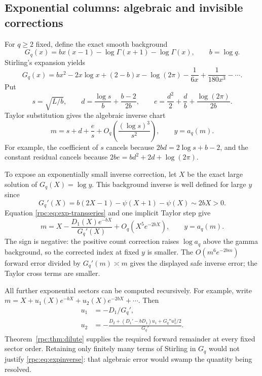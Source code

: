 \documentclass[11pt]{article}
\theoremstyle{definition}
\theoremstyle{remark}
\numberwithin{equation}{section}
\begin{document}
\subsection{Exponential columns: algebraic and invisible corrections}

For $q\ge2$ fixed, define the exact smooth background
\begin{equation}\label{rpc:eq:F0}
 G_q(x)=b x(x-1)-\log\Gamma(x+1)-\log\Gamma(x),\qquad b=\log q.
\end{equation}
Stirling's expansion yields
\[
 G_q(x)=b x^2-2x\log x+(2-b)x-\log(2\pi)
                -\frac1{6x}+\frac1{180x^3}-\cdots.
\]
Put
\begin{equation}\label{rpc:eq:sde}
 s=\sqrt{L/b},\qquad
 d=\frac{\log s}{b}+\frac{b-2}{2b},\qquad
 e=\frac{d^2}{2}+\frac db+\frac{\log(2\pi)}{2b}.
\end{equation}
Taylor substitution gives the algebraic inverse chart
\begin{equation}\label{rpc:eq:expalginverse}
 m=s+d+\frac es+O_q\!\left(\frac{(\log s)^3}{s^2}\right),
                         \qquad y=a_q(m).
\end{equation}
For example, the coefficient of $s$ cancels because
$2bd=2\log s+b-2$, and the constant residual cancels because
$2be=bd^2+2d+\log(2\pi)$.

To expose an exponentially small inverse correction, let $X$ be the exact
large solution of $G_q(X)=\log y$. This background inverse is well defined
for large $y$ since
\[
 G_q'(X)=b(2X-1)-\psi(X+1)-\psi(X)\sim2bX>0.
\]
Equation \eqref{rpc:eq:exp-transseries} and one implicit Taylor step give
\begin{equation}\label{rpc:eq:expinverse}
 m=X-\frac{D_1(X)e^{-bX}}{G_q'(X)}
             +O_q(X^5e^{-2bX}),\qquad y=a_q(m).
\end{equation}
The sign is negative: the positive count correction raises $\log a_q$ above
the gamma background, so the corrected index at fixed $y$ is smaller.
The $O(m^6e^{-2bm})$ forward error divided by $G_q'(m)\asymp m$ gives
the displayed safe inverse error; the Taylor cross terms are smaller.

All further exponential sectors can be computed recursively. For example,
write $m=X+u_1(X)e^{-bX}+u_2(X)e^{-2bX}+\cdots$. Then
\begin{align}\label{rpc:eq:inverse-sector-rec}
 u_1&=-D_1/G_q',\\
 u_2&=-\frac{D_2+(D_1'-bD_1)u_1+G_q''u_1^2/2}{G_q'}.
\end{align}
Theorem~\ref{rpc:thm:dilute} supplies the required forward remainder at every
fixed sector order. Retaining only finitely many terms of Stirling in
$G_q$ would not justify \eqref{rpc:eq:expinverse}: that algebraic error would
swamp the quantity being resolved.
\end{document}
